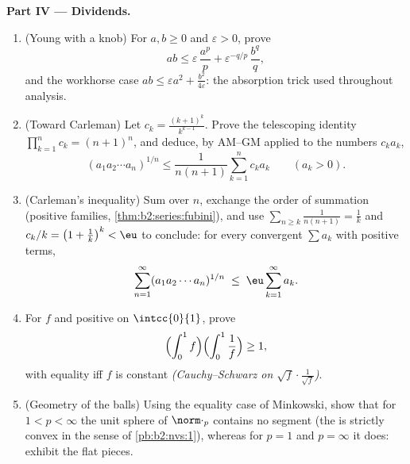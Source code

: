 \begin{problem}
\medskip
\noindent\textbf{Part IV --- Dividends.}
\begin{enumerate}[resume]
  \item (Young with a knob) For $a, b \geq 0$ and $\varepsilon >
        0$, prove
        \[
        ab \leq \varepsilon\,\frac{a^p}{p} +
        \varepsilon^{-q/p}\,\frac{b^q}{q},
        \]
        and the workhorse case $ab \leq \varepsilon a^2 +
        \frac{b^2}{4\varepsilon}$: the absorption trick used
        throughout analysis.
  \item (Toward Carleman) Let $c_k = \frac{(k+1)^k}{k^{k-1}}$.
        Prove the telescoping identity $\prod_{k=1}^{n}c_k =
        (n+1)^n$, and deduce, by AM--GM applied to the numbers
        $c_ka_k$,
        \[
        (a_1a_2\cdots a_n)^{1/n} \leq
        \frac{1}{n(n+1)}\sum_{k=1}^{n} c_k a_k
        \qquad (a_k > 0).
        \]
  \item (Carleman's inequality) Sum over $n$, exchange the
        order of summation (positive  families,
        \cref{thm:b2:series:fubini}), and use $\sum_{n \geq
        k}\frac{1}{n(n+1)} = \frac1k$ and $c_k/k = \bigl(1 +
        \frac1k\bigr)^k < \eu$ to conclude: for every
        convergent $\sum a_k$ with positive terms,
        \[
        \sum_{n=1}^{\infty}(a_1a_2\cdots a_n)^{1/n}
        \;\leq\; \eu\sum_{k=1}^{\infty}a_k .
        \]
  \item For $f$  and positive on $\intcc{0}{1}$,
        prove
        \[
        \Bigl(\int_0^1 f\Bigr)\Bigl(\int_0^1\frac1f\Bigr)
        \geq 1,
        \]
        with equality iff $f$ is constant
        \emph{(Cauchy--Schwarz on $\sqrt f\cdot\frac1{\sqrt
        f}$)}.
  \item (Geometry of the balls) Using the equality case of
        Minkowski, show that for $1 < p < \infty$ the unit
        sphere of $\norm\cdot_p$ contains no segment (the 
        is strictly convex in the sense of
        \cref{pb:b2:nvs:1}), whereas for $p = 1$ and $p =
        \infty$ it does: exhibit the flat pieces.
\end{enumerate}


\end{problem}
